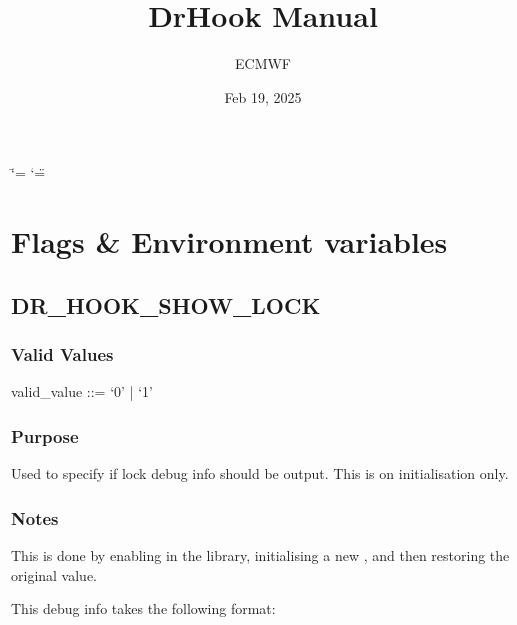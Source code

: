 \documentclass[letterpaper,10pt,english]{sphinxmanual}
\title{DrHook Manual}
\date{Feb 19, 2025}
\author{ECMWF}
\begin{document}
\ifdefined\shorthandoff
  \ifnum\catcode`\=\string=\active\shorthandoff{=}\fi
  \ifnum\catcode`\"=\active{}\fi
\fi

\pagestyle{empty}
\sphinxmaketitle
\pagestyle{plain}
\sphinxtableofcontents
\pagestyle{normal}
\label{\detokenize{index::doc}}


\sphinxstepscope


\chapter{Flags \& Environment variables}
\label{\detokenize{flag/flag:flags-environment-variables}}\label{\detokenize{flag/flag::doc}}

\section{DR\_HOOK\_SHOW\_LOCK}
\label{\detokenize{flag/flag:dr-hook-show-lock}}\label{\detokenize{flag/flag:id1}}

\subsection{Valid Values}
\label{\detokenize{flag/flag:valid-values}}
\begin{DUlineblock}{0em}
\item[] valid\_value ::= ‘0’ | ‘1’
\end{DUlineblock}


\subsection{Purpose}
\label{\detokenize{flag/flag:purpose}}
\sphinxAtStartPar
Used to specify if lock debug info should be output. This is on initialisation only.


\subsection{Notes}
\label{\detokenize{flag/flag:notes}}
\sphinxAtStartPar
This is done by enabling  in the  library, initialising a new , and then restoring the original value.

\begin{DUlineblock}{0em}
\item[] This debug info takes the following format:
\item[] 
\end{DUlineblock}
\end{document}
